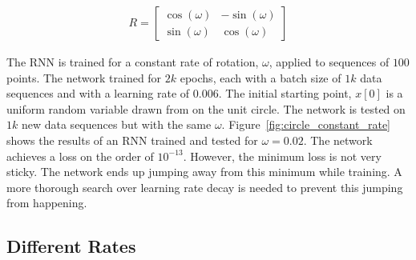 \begin{align}
R = \begin{bmatrix}
\cos(\omega) & - \sin(\omega) \\
\sin(\omega) & \cos(\omega)
\end{bmatrix}
\end{align} 

The RNN is trained for a constant rate of rotation, $\omega$, applied to sequences of $100$ points.  The network trained for $2k$ epochs, each with a batch size of $1k$ data sequences and with a learning rate of $0.006$.  The initial starting point, $x[0]$ is a uniform random variable drawn from on the unit circle. 
The network is tested on $1k$ new data sequences but with the same $\omega$.
Figure~\ref{fig:circle_constant_rate} shows the results of an RNN trained and tested for $\omega=0.02$.  
The network achieves a loss on the order of $10^{-13}$.  However, the minimum loss is not very sticky.  The network ends up jumping away from this minimum while training.  A more thorough search over learning rate decay is needed to prevent this jumping from happening.

\subsection{Different Rates}

